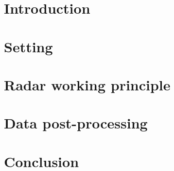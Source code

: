\section{Introduction}

\section{Setting}

\section{Radar working principle}

\section{Data post-processing}

\section{Conclusion}


